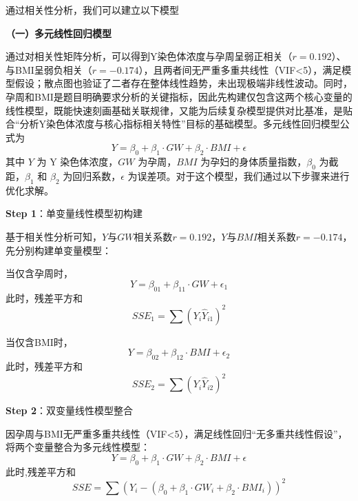 \documentclass[withoutpreface,bwprint]{cumcmthesis} %
\begin{document}
通过相关性分析，我们可以建立以下模型


\textbf{（一）多元线性回归模型}

通过对相关性矩阵分析，可以得到Y染色体浓度与孕周呈弱正相关（$r=0.192$）、与BMI呈弱负相关（$r=-0.174$），且两者间无严重多重共线性（VIF<5），满足模型假设；散点图也验证了二者存在整体线性趋势，未出现极端非线性波动。同时，孕周和BMI是题目明确要求分析的关键指标，因此先构建仅包含这两个核心变量的线性模型，既能快速刻画基础关联规律，又能为后续复杂模型提供对比基准，是贴合“分析Y染色体浓度与核心指标相关特性”目标的基础模型。多元线性回归模型公式为
\begin{equation}
    Y = \beta_0 + \beta_1 \cdot GW + \beta_2 \cdot BMI + \epsilon
\end{equation}
其中 $Y$ 为 Y 染色体浓度，$GW$ 为孕周，$BMI$ 为孕妇的身体质量指数，$\beta_0$ 为截距，$\beta_1$ 和 $\beta_2$ 为回归系数，$\epsilon$ 为误差项。对于这个模型，我们通过以下步骤来进行优化求解。

\textbf{Step 1}：单变量线性模型初构建  

基于相关性分析可知，$Y$与$GW$相关系数$r=0.192$，$Y$与$BMI$相关系数$r=-0.174$，先分别构建单变量模型：

    当仅含孕周时，
    \begin{equation}
        Y = \beta_{01} + \beta_{11} \cdot GW + \epsilon_1
    \end{equation}
    此时，残差平方和
    \begin{equation}
        SSE_1 = \sum (Y_i \hat{Y}_{i1})^2
    \end{equation}

    当仅含BMI时，
    \begin{equation}
        Y = \beta_{02} + \beta_{12} \cdot BMI + \epsilon_2
    \end{equation}
此时，残差平方和
    \begin{equation}
        SSE_2 = \sum (Y_i \hat{Y}_{i2})^2
    \end{equation}

 
\textbf{Step 2}：双变量线性模型整合  

因孕周与BMI无严重多重共线性（VIF<5），满足线性回归“无多重共线性假设”，将两个变量整合为多元线性模型：  
\begin{equation}
    Y = \beta_0 + \beta_1 \cdot GW + \beta_2 \cdot BMI + \epsilon
\end{equation}
此时,残差平方和
\begin{equation}
    SSE = \sum (Y_i - (\beta_0 + \beta_1 \cdot GW_i + \beta_2 \cdot BMI_i))^2
\end{equation}
\end{document}
